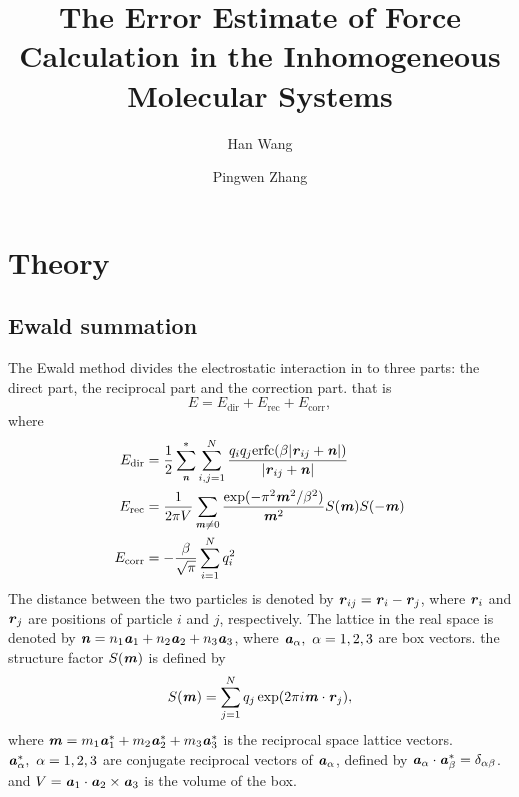 \documentclass[aps,pre,preprint]{revtex4}
\renewcommand{\v}[1]{\textbf{\textit{#1}}}
\begin{document}
\title{The Error Estimate of Force Calculation in the Inhomogeneous Molecular Systems}
\author{Han Wang}
\author{Pingwen Zhang}

\begin{abstract}
\end{abstract}

\maketitle

\section{Theory}
\subsection{Ewald summation}
The Ewald method divides the electrostatic interaction in to three
parts: the direct part, the reciprocal part and the correction
part. that is
\begin{equation}
E = E_{\textrm{dir}} + E_{\textrm{rec}} + E_{\textrm{corr}},
\end{equation}
where 
\begin {align}\label{eqn:tmp2}
E_{\textrm{dir}} & = \frac12 \sum^{\ast}_{\v n}
\sum_{i,j = 1}^{N} \frac{q_iq_j \textrm{erfc}(\beta \vert\v{r}_{ij} + \v{n}\vert)}
{\vert\v{r}_{ij} + \v{n}\vert} \\\label{eqn:tmp3}
E_{\textrm{rec}} & = \frac1{2\pi V} \sum_{\v m \neq 0}
\frac{\exp(-\pi^2\v m^2 / \beta^2)}{\v m^2} S(\v m) S(-\v m) \\\label{eqn:tmp4}
 E_{\textrm{corr}}& = -\frac\beta{\sqrt \pi} \sum_{i=1}^N q_i^2
\end {align}
The distance between the two particles is denoted by $\v r_{ij} = \v
r_i - \v r_j$, where $\v r_i$ and $\v r_j$ are positions of particle
$i$ and $j$, respectively.  The lattice in the real space is denoted
by $\v n = n_1 \v a_1 + n_2 \v a_2 + n_3 \v a_3$, where $\v a_\alpha,
\ \alpha=1,2,3$ are box vectors. the structure factor $S(\v m)$ is
defined by
\begin{equation}\label{sm1}
S(\v m) = \sum_{j=1}^N q_j \exp (2 \pi i \v m \cdot \v r_j),
\end{equation}
where $\v m = m_1 \v a_1^\ast + m_2 \v a_2^\ast + m_3 \v a_3^\ast$ is
the reciprocal space lattice vectors. $\v a_\alpha^\ast,\ \alpha = 1,
2, 3$ are conjugate reciprocal vectors of $\v a_\alpha$, defined by
$\v a_\alpha \cdot \v a_\beta^\ast = \delta_{\alpha\beta}$. and $V =
\v a_1 \cdot \v a_2 \times \v a_3$ is the volume of the box.
\end{document}
